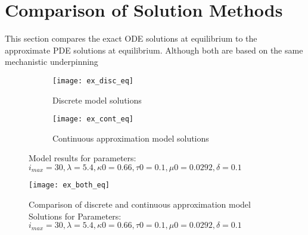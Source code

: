 \documentclass[review]{elsarticle}
\begin{document}
\section{Comparison of Solution Methods}
This section compares the exact ODE solutions at equilibrium to the approximate PDE solutions at equilibrium.
Although both are based on the same mechanistic underpinning 

\begin{figure}[h]
\centering
\begin{subfigure}[h]{0.4\textwidth}
\texttt{[image: ex\_disc\_eq]}
\caption{Discrete model solutions}
\end{subfigure}
\begin{subfigure}[h]{0.4\textwidth}
\texttt{[image: ex\_cont\_eq]}
\caption{Continuous approximation model solutions}
\end{subfigure}
\caption{Model results for parameters: $i_{max}=30,\lambda=5.4,\kappa 0=0.66,\tau 0=0.1,\mu 0=0.0292,\delta=0.1$}
\end{figure}

\begin{figure}[h]
\centering
\texttt{[image: ex\_both\_eq]}
\caption{Comparison of discrete and continuous approximation model Solutions for Parameters: $i_{max}=30,\lambda=5.4,\kappa 0=0.66,\tau 0=0.1,\mu 0=0.0292,\delta=0.1$}
\end{figure}
\end{document}
